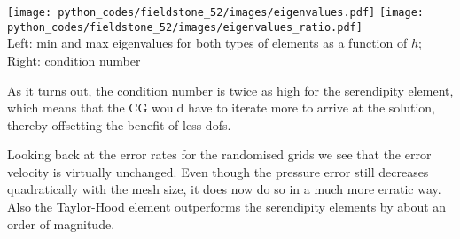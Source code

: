 \begin{center}
\texttt{[image: python\_codes/fieldstone\_52/images/eigenvalues.pdf]}
\texttt{[image: python\_codes/fieldstone\_52/images/eigenvalues\_ratio.pdf]}\\
{\captionfont Left: min and max eigenvalues for both types of elements as a function of $h$; 
Right: condition number}
\end{center}
As it turns out, the condition number is twice as high for the serendipity element, 
which means that the CG would have to iterate more to arrive at the solution, 
thereby offsetting the benefit of less dofs.

Looking back at the error rates for the randomised grids we see that the error 
velocity is virtually unchanged. Even though the pressure error still decreases 
quadratically with the mesh size, it does now do so in a much more erratic way. 
Also the Taylor-Hood element outperforms the serendipity elements by about an 
order of magnitude. 



